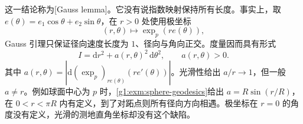 这一结论称为[Gauss lemma]。它没有说指数映射保持所有长度。事实上，取 \(e(\theta)=e_1\cos\theta+e_2\sin\theta\)，在 \(r>0\) 处使用极坐标
\[
	(r,\theta)\longmapsto\exp_p(re(\theta)),
\]
Gauss 引理只保证径向速度长度为 \(1\)、径向与角向正交。度量因而具有形式
\begin{equation}
	\label{g1:eq:geodesic-polar-metric}
	I=\mathrm{d}r^2+a(r,\theta)^2\,\mathrm{d}\theta^2,\qquad a(r,\theta)>0.
\end{equation}
其中 \(a(r,\theta)=|\mathrm{d}(\exp_p)_{re(\theta)}(r e'(\theta))|\)。光滑性给出 \(a/r\to1\)，但一般 \(a\ne r\)。例如球面中心为 \(p\) 时，\cref{g1:exm:sphere-geodesics}给出 \(a=R\sin(r/R)\)，在 \(0<r<\pi R\) 内有定义，到了对跖点则所有径向方向相遇。极坐标在 \(r=0\) 的角度没有定义，光滑的测地直角坐标却没有这个缺陷。



